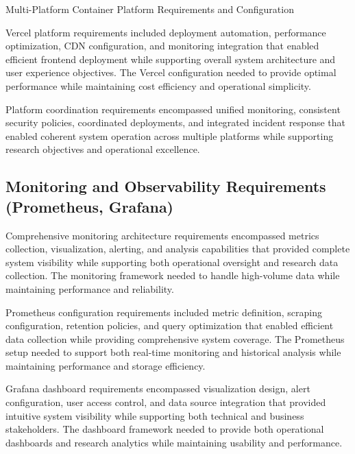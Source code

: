 \begin{table}[H]
\centering
\caption{Multi-Platform Container Platform Requirements and Configuration}
\label{tab:multi-platform-container-requirements}
\end{table}

Vercel platform requirements included deployment automation, performance optimization, CDN configuration, and monitoring integration that enabled efficient frontend deployment while supporting overall system architecture and user experience objectives. The Vercel configuration needed to provide optimal performance while maintaining cost efficiency and operational simplicity.

Platform coordination requirements encompassed unified monitoring, consistent security policies, coordinated deployments, and integrated incident response that enabled coherent system operation across multiple platforms while supporting research objectives and operational excellence.

\subsection{Monitoring and Observability Requirements (Prometheus, Grafana)}

Comprehensive monitoring architecture requirements encompassed metrics collection, visualization, alerting, and analysis capabilities that provided complete system visibility while supporting both operational oversight and research data collection. The monitoring framework needed to handle high-volume data while maintaining performance and reliability.

Prometheus configuration requirements included metric definition, scraping configuration, retention policies, and query optimization that enabled efficient data collection while providing comprehensive system coverage. The Prometheus setup needed to support both real-time monitoring and historical analysis while maintaining performance and storage efficiency.

Grafana dashboard requirements encompassed visualization design, alert configuration, user access control, and data source integration that provided intuitive system visibility while supporting both technical and business stakeholders. The dashboard framework needed to provide both operational dashboards and research analytics while maintaining usability and performance.

